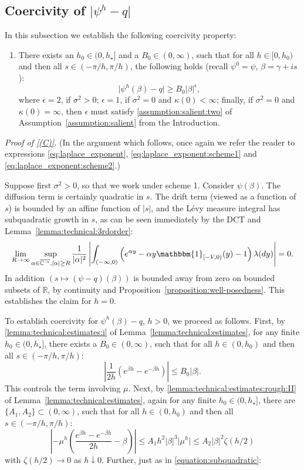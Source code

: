 \documentclass[pdftex,oneside,11pt,reqno]{amsart}
\theoremstyle{definition}
\theoremstyle{theorem}
\theoremstyle{remark}
\numberwithin{equation}{section}
\numberwithin{definition}{section}
\begin{document}
\subsection{Coercivity of $\vert\psi^h-q\vert$}\label{subsection:coercivity}
In this subsection we establish the following coercivity property:
\begin{enumerate}[label=(C),ref=(C)]
\item\label{(C)} There exists an $h_0\in (0,h_\star]$ and a $B_0\in (0,\infty)$, such that for all $h\in [0,h_0)$ and then all $s\in (-\pi/h,\pi/h)$, the following holds (recall $\psi^0=\psi$, $\beta=\gamma+is$): $$\vert \psi^h(\beta)-q\vert\geq B_0\vert \beta\vert^\epsilon,$$  where $\epsilon=2$, if ${\sigma^2}>0$; $\epsilon=1$, if ${\sigma^2}=0$ and $\kappa(0)<\infty$; finally, if ${\sigma^2}=0$ and $\kappa(0)=\infty$, then $\epsilon$ must satisfy \ref{assumption:salient:two} of Assumption~\ref{assumption:salient} from the Introduction.
\end{enumerate}
\noindent \emph{Proof of \ref{(C)}.}
(In the argument which follows, once again we refer the reader to expressions \eqref{eq:laplace_exponent}, \eqref{eq:laplace_exponent:scheme1} and \eqref{eq:laplace_exponent:scheme2}.) 

Suppose first ${\sigma^2}>0$, so that we work under scheme 1. Consider $\psi(\beta)$. The diffusion term is certainly quadratic in $s$. The drift term (viewed as a function of $s$) is bounded by an affine function of $\vert s\vert$, and the L\'evy measure integral has subquadratic growth in $s$, as can be seen immediately by the DCT and Lemma~\ref{lemma:technical:3rdorder}: 
\begin{equation}\label{equation:subquadratic}
\lim_{R\to\infty}\sup_{\alpha\in {\overline{\mathbb{C}^{\rightarrow}}},\vert \alpha\vert\geq R}\frac{1}{\vert \alpha\vert^2}\left\vert\int_{(-\infty,0)}\left(e^{\alpha y}-\alpha y{\mathbbm{1}_{[-V,0)}}(y)-1\right){\lambda}(dy)\right\vert=0.
\end{equation} 
In addition $(s\mapsto (\psi-q)(\beta))$ is bounded away from zero on bounded subsets of ${\mathbb R}$, by continuity and Proposition~\ref{proposition:well-posedness}. This establishes the claim for $h=0$. 

To establish coercivity for $\psi^h(\beta)-q$, $h>0$, we proceed as follows. First, by \ref{lemma:technical:estimates:i} of Lemma~\ref{lemma:technical:estimates}, for any finite $h_0\in (0,h_\star]$, there exists a $B_0\in (0,\infty)$, such that for all $h\in (0,h_0)$ and then all $s\in (-\pi/h,\pi/h)$: $$\left\vert\frac{1}{2h}(e^{\beta h}-e^{-\beta h})\right\vert\leq B_0\vert \beta\vert.$$ This controls the term involving $\mu$. Next, by \ref{lemma:technical:estimates:rough:II} of Lemma~\ref{lemma:technical:estimates}, again for any finite $h_0\in (0,h_\star]$, there are $\{A_1,A_2\}\subset (0,\infty)$, such that for all $h\in (0,h_0)$ and then all $s\in (-\pi/h,\pi/h)$: 
\begin{equation*}
\left\vert - \mu^h\left(\frac{e^{\beta h}-e^{-\beta h}}{2h}-\beta\right)\right\vert\leq A_1h^2\vert \beta\vert^3\vert \mu^h\vert\leq A_2 \vert \beta\vert^2\zeta(h/2)
\end{equation*}
with $\zeta(h/2)\to 0$ as $h\downarrow 0$. Further, just as in \eqref{equation:subquadratic}:
\end{document}

